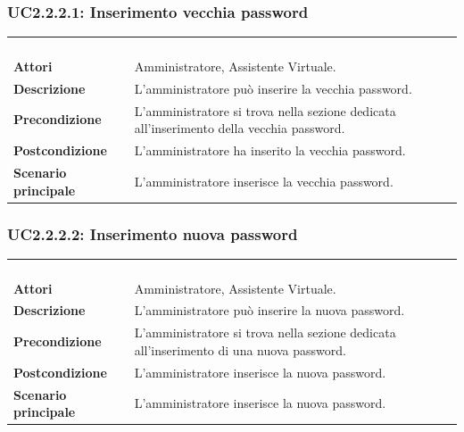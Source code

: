 \subsubsection{UC2.2.2.1: Inserimento vecchia password}
\label{UC2.2.2.1}
\begin{longtable}{l|p{10cm}}
\rowcolor[gray]{0.8} \multicolumn{2}{c}{} \\
\rowcolor[gray]{0.8} \multicolumn{2}{c}{\textbf{UC2.2.2.1 - Inserimento vecchia password}} \\
\rowcolor[gray]{0.8} \multicolumn{2}{c}{} \\
\hline
&\\
\textbf{Attori} & Amministratore, Assistente Virtuale.\\[7pt]
\textbf{Descrizione} & L'amministratore può inserire la vecchia password.\\[7pt]
\textbf{Precondizione} & L'amministratore si trova nella sezione dedicata all'inserimento della vecchia password.\\[7pt]
\textbf{Postcondizione} & L'amministratore ha inserito la vecchia password.\\[7pt]
\textbf{Scenario principale} &L'amministratore inserisce la vecchia password.\\[7pt]\hline
\end{longtable}

\subsubsection{UC2.2.2.2: Inserimento nuova password}
\label{UC2.2.2.2}
\begin{longtable}{l|p{10cm}}
\rowcolor[gray]{0.8} \multicolumn{2}{c}{} \\
\rowcolor[gray]{0.8} \multicolumn{2}{c}{\textbf{UC2.2.2.2 - Inserimento nuova password}} \\
\rowcolor[gray]{0.8} \multicolumn{2}{c}{} \\
\hline
&\\
\textbf{Attori} & Amministratore, Assistente Virtuale.\\[7pt]
\textbf{Descrizione} & L'amministratore può inserire la nuova password.\\[7pt]
\textbf{Precondizione} & L'amministratore si trova nella sezione dedicata all'inserimento di una nuova password.\\[7pt]
\textbf{Postcondizione} & L'amministratore inserisce la nuova password.\\[7pt]
\textbf{Scenario principale} &L'amministratore inserisce la nuova password.\\[7pt]\hline
\end{longtable}

